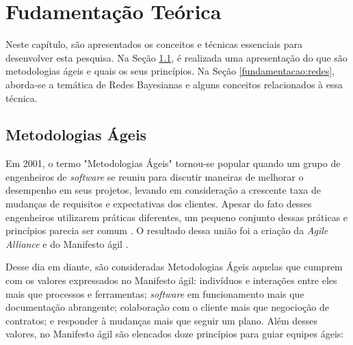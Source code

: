 \chapter{Fudamentação Teórica}
\label{fundamentacao}

Neste capítulo, são apresentados os conceitos e técnicas essenciais para desenvolver esta pesquisa. Na Seção \ref{fundamentacao:ageis}, é realizada uma apresentação do que são metodologias ágeis e quais os seus princípios. Na Seção \ref{fundamentacao:redes}, aborda-se a temática de Redes Bayesianas e alguns conceitos relacionados à essa técnica.

\section{Metodologias Ágeis}
\label{fundamentacao:ageis}

Em 2001, o termo "Metodologias Ágeis" tornou-se popular quando um grupo de engenheiros de \textit{software} se reuniu para discutir maneiras de melhorar o desempenho em seus projetos, levando em consideração a crescente taxa de mudanças de requisitos e expectativas dos clientes. Apesar do fato desses engenheiros utilizarem práticas diferentes, um pequeno conjunto dessas práticas e princípios parecia ser comum \cite{williams}. O resultado dessa união foi a criação da \textit{Agile Alliance} e do Manifesto ágil \cite{manifesto}.

Desse dia em diante, são consideradas Metodologias Ágeis aquelas que cumprem com os valores expressados no Manifesto ágil: indivíduos e interações entre eles mais que processos e ferramentas; \textit{software} em funcionamento mais que documentação abrangente; colaboração com o cliente mais que negocioção de contratos; e responder à mudanças mais que seguir um plano. Além desses valores, no Manifesto ágil são elencados doze princípios para guiar equipes ágeis:

